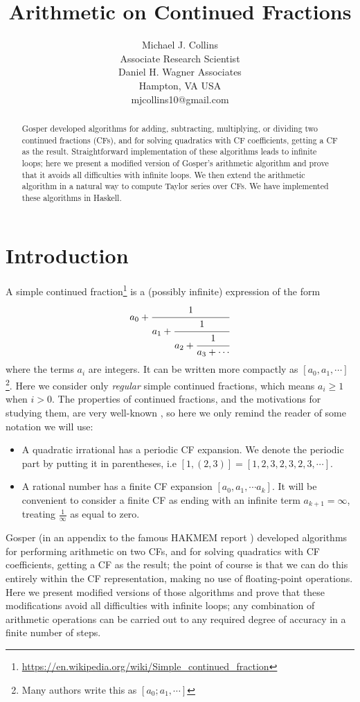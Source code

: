 \documentclass[11pt, oneside]{amsart}   	%
\title{Arithmetic on Continued Fractions}
\author{Michael J. Collins\\Associate Research Scientist\\Daniel H. Wagner Associates\\Hampton, VA USA\\mjcollins10@gmail.com}
\renewcommand{\:}{\negthickspace:\negthickspace}
\begin{document}
\begin{abstract}
Gosper  developed algorithms for adding, subtracting, multiplying, or dividing two continued fractions (CFs), and for solving quadratics with CF coefficients,
getting a CF as the result. Straightforward implementation of these algorithms leads to infinite loops; here we present a modified version of Gosper's arithmetic algorithm and prove that it avoids all difficulties with infinite loops. We then extend the arithmetic algorithm in a natural way to compute Taylor series over CFs.
We have implemented these algorithms in Haskell.
\end{abstract}

\maketitle

\section{Introduction}
A simple continued fraction\footnote{\href{https://en.wikipedia.org/wiki/Simple\_continued\_fraction}{https://en.wikipedia.org/wiki/Simple\_continued\_fraction}} is a (possibly infinite) expression of the form
\begin{equation*}
a_0+\cfrac{1}{a_1+\cfrac{1}{a_2+\cfrac{1}{a_3+\cdots}}}
\end{equation*}
where the terms $a_i$ are integers. It can be written more compactly as $[a_0, a_1, \cdots]$\footnote{Many authors write this as $[a_0; a_1, \cdots]$}. Here we consider only \emph{regular} simple continued fractions, which means $a_i \geq 1$ when $i>0$. The
properties of continued fractions, and the motivations for studying them, are very well-known \cite{rockett1992continued},
so here we only remind the reader of some notation we will use:
\begin{itemize}
\item A quadratic irrational has a periodic CF expansion. We denote the periodic part by putting it in parentheses,
i.e $[1,(2,3)] = [1,2,3,2,3,2,3,\cdots]$.
\item A rational number has a finite CF expansion $[a_0,a_1, \cdots a_k]$.
It will be convenient to consider a finite CF as ending with an infinite term $a_{k+1}=\infty$, treating $\frac{1}{\infty}$ as equal to zero.
\end{itemize}
 
Gosper (in an appendix to the famous HAKMEM report \cite{hakmem}) 
developed algorithms for performing arithmetic on two CFs, and for solving quadratics with CF coefficients, getting a CF as the result;
the point of course is that we can do this entirely within the CF representation, making no use of floating-point operations. Here we
present modified versions of those algorithms and prove that these modifications avoid all difficulties with infinite loops;
any combination of arithmetic operations can be carried out to any required degree of accuracy in a finite number of steps.
\end{document}
